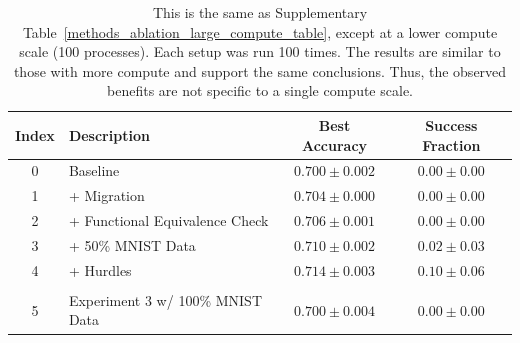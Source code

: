 {\begin{table}[!ht]
\caption{This is the same as Supplementary Table~\ref{methods_ablation_large_compute_table}, except at a lower compute scale (100 processes). Each setup was run 100 times. The results are similar to those with more compute and support the same conclusions. Thus, the observed benefits are not specific to a single compute scale.}
\label{methods_ablation_mid_compute_table}
\begin{center}
\begin{small}
\begin{sc}
\begin{tabular}{clcc}
\toprule
Index & Description & Best Accuracy & Success Fraction \\
\midrule
0 & Baseline & $0.700 \pm 0.002$ & $0.00 \pm 0.00$ \\
1 & + Migration & $0.704 \pm 0.000$ & $0.00 \pm 0.00$ \\
2 & + Functional Equivalence Check & $0.706 \pm 0.001$ & $0.00 \pm 0.00$ \\
3 & + 50\% MNIST Data & $0.710 \pm 0.002$ & $0.02 \pm 0.03$ \\
4& + Hurdles & $0.714 \pm 0.003$ & $0.10 \pm 0.06$ \\
\\
5 & Experiment 3 w/ 100\% MNIST Data & $0.700 \pm 0.004$ & $0.00 \pm 0.00$ \\
\bottomrule
\end{tabular}
\end{sc}
\end{small}
\end{center}
\end{table}

}
